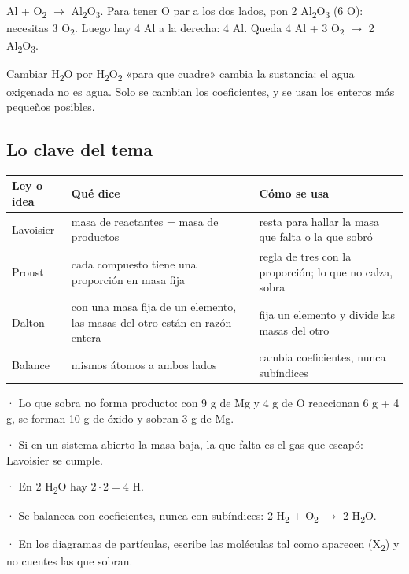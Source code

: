 \begin{clave} Al + O\textsubscript{2} \ensuremath{\rightarrow} Al\textsubscript{2}O\textsubscript{3}. Para tener O par a los dos lados, pon 2 Al\textsubscript{2}O\textsubscript{3} (6 O): necesitas 3 O\textsubscript{2}. Luego hay 4 Al a la derecha: 4 Al. Queda 4 Al + 3 O\textsubscript{2} \ensuremath{\rightarrow} 2 Al\textsubscript{2}O\textsubscript{3}.\end{clave}
 
\begin{ojo} Cambiar H\textsubscript{2}O por H\textsubscript{2}O\textsubscript{2} «para que cuadre» cambia la sustancia: el agua oxigenada no es agua. Solo se cambian los coeficientes, y se usan los enteros más pequeños posibles.\end{ojo}
\subsection{Lo clave del tema}
\begin{center}\small
\begin{tabularx}{\linewidth}{@{}>{\raggedright\arraybackslash\hsize=0.39\hsize}X>{\raggedright\arraybackslash\hsize=1.30\hsize}X>{\raggedright\arraybackslash\hsize=1.30\hsize}X@{}}
\toprule
\textbf{Ley o idea} & \textbf{Qué dice} & \textbf{Cómo se usa} \\
\midrule
Lavoisier & masa de reactantes = masa de productos & resta para hallar la masa que falta o la que sobró \\
Proust & cada compuesto tiene una proporción en masa fija & regla de tres con la proporción; lo que no calza, sobra \\
Dalton & con una masa fija de un elemento, las masas del otro están en razón entera & fija un elemento y divide las masas del otro \\
Balance & mismos átomos a ambos lados & cambia coeficientes, nunca subíndices \\
\bottomrule
\end{tabularx}
\end{center}
 
\begin{clave}[{Recuerda}] · Lo que sobra no forma producto: con 9 g de Mg y 4 g de O reaccionan 6 g + 4 g, se forman 10 g de óxido y sobran 3 g de Mg.\par · Si en un sistema abierto la masa baja, la que falta es el gas que escapó: Lavoisier se cumple.\par · En 2 H\textsubscript{2}O hay $2\cdot 2 = 4$ H.\par · Se balancea con coeficientes, nunca con subíndices: 2 H\textsubscript{2} + O\textsubscript{2} \ensuremath{\rightarrow} 2 H\textsubscript{2}O.\par · En los diagramas de partículas, escribe las moléculas tal como aparecen (X\textsubscript{2}) y no cuentes las que sobran.\end{clave}
 

